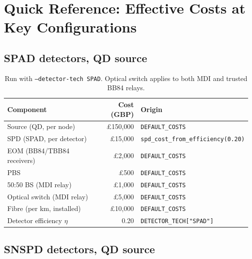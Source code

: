 \documentclass[12pt,a4paper]{article}
\begin{document}
\section{Quick Reference: Effective Costs at Key Configurations}

\subsection{SPAD detectors, QD source}

\begin{table}[h!]
\centering
\begin{tabular}{lrl}
\toprule
Component & Cost (GBP) & Origin \\
\midrule
Source (QD, per node)          & \pounds150{,}000 & \texttt{DEFAULT\_COSTS} \\
SPD (SPAD, per detector)       & \pounds15{,}000  & \texttt{spd\_cost\_from\_efficiency(0.20)} \\
EOM (BB84/TBB84 receivers)     & \pounds2{,}000   & \texttt{DEFAULT\_COSTS} \\
PBS                            & \pounds500       & \texttt{DEFAULT\_COSTS} \\
50:50 BS (MDI relay)           & \pounds1{,}000   & \texttt{DEFAULT\_COSTS} \\
Optical switch (MDI relay)     & \pounds5{,}000   & \texttt{DEFAULT\_COSTS} \\
Fibre (per km, installed)      & \pounds10{,}000  & \texttt{DEFAULT\_COSTS} \\
Detector efficiency $\eta$     & 0.20             & \texttt{DETECTOR\_TECH["SPAD"]} \\
\bottomrule
\end{tabular}
\caption{Run with \texttt{--detector-tech SPAD}. Optical switch applies to both
MDI and trusted BB84 relays.}
\end{table}

\subsection{SNSPD detectors, QD source}
\end{document}

